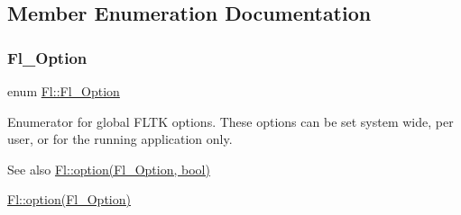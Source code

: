 \subsection{Member Enumeration Documentation}
\mbox{\label{class_fl_a43e6e0bbbc03cad134d928d4edd48d1d}} 
\subsubsection{\texorpdfstring{Fl\+\_\+\+Option}{Fl\_Option}}
{\footnotesize\ttfamily enum \hyperlink{class_fl_a43e6e0bbbc03cad134d928d4edd48d1d}{Fl\+::\+Fl\+\_\+\+Option}}

Enumerator for global F\+L\+TK options. These options can be set system wide, per user, or for the running application only. \begin{DoxySeeAlso}{See also}
\hyperlink{class_fl_a3d05604368612a03f1a91d440f34ed11}{Fl\+::option(\+Fl\+\_\+\+Option, bool)} 

\hyperlink{class_fl_a1f2a298d306f170fbb8d3caa7ebb079f}{Fl\+::option(\+Fl\+\_\+\+Option)} 
\end{DoxySeeAlso}
